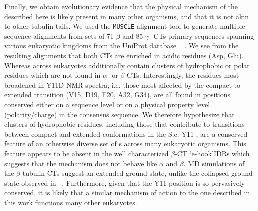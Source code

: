 \begin{figure}
	\thispagestyle{empty}
	\centering     %
	\clearpage
	\label{fig:globular}
\end{figure}


Finally, we obtain evolutionary evidence that the physical mechanism of the \gct described here is likely present in many other organisms, and that it is not akin to other tubulin tails.  We used the \texttt{MUSCLE} alignment tool \cite{edgar2004muscle} to generate multiple sequence alignments from sets of 71 $\beta$ and 85 $\gamma$- CTs primary sequences spanning various eukaryotic kingdoms from the UniProt database ~\cite{apweiler2004uniprot} .  We see from the resulting alignments that both CTs are enriched in acidic residues (Asp, Glu). Whereas \gct across eukaryotes additionally contain clusters of hydrophobic or polar residues which are not found in $\alpha$- or $\beta$-CTs. Interestingly, the residues most broadened in Y11D NMR spectra, i.e. those most affected by the compact-to-extended transition (V15, D19, E20, A32, G34), are all found in positions conserved either on a sequence level or on a physical property level (polarity/charge) in the consensus \gct sequence. We therefore hypothesize that clusters of hydrophobic residues, including those that contribute to transitions between compact and extended conformations in the S.c. Y11 \gct, are a conserved feature of an otherwise diverse set of \gct s across many eukaryotic organisms. This feature appears to be absent in the well characterized $\beta$-CT \lq e-hook\rq IDRs which suggests that the \gct mechanism does not behave like $\alpha$ and $\beta$. MD simulations of the $\beta$-tubulin CTs suggest an extended ground state, unlike the collapsed ground state observed in \gct ~\cite{luchko2008conformational}.   Furthermore, given that the Y11 position is so pervasively conserved, it is likely that a similar mechanism of action to the one described in this work functions many other eukaryotes.

